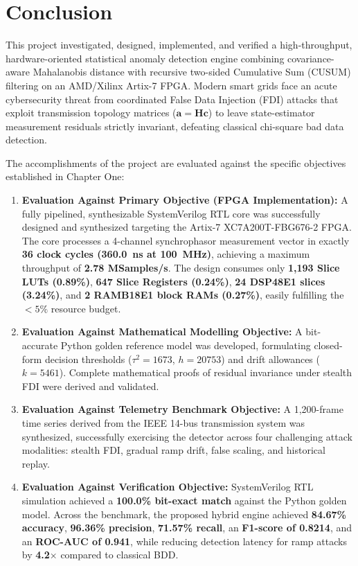 \documentclass[11pt,a4paper]{report}
\begin{document}
\section{Conclusion}
This project investigated, designed, implemented, and verified a high-throughput,
hardware-oriented statistical anomaly detection engine combining covariance-aware
Mahalanobis distance with recursive two-sided Cumulative Sum (CUSUM) filtering on
an AMD/Xilinx Artix-7 FPGA. Modern smart grids face an acute cybersecurity threat
from coordinated False Data Injection (FDI) attacks that exploit transmission topology
matrices ($\boldsymbol{a} = \boldsymbol{H}\boldsymbol{c}$) to leave state-estimator
measurement residuals strictly invariant, defeating classical chi-square bad data detection.

The accomplishments of the project are evaluated against the specific objectives
established in Chapter One:
\begin{enumerate}
    \item \textbf{Evaluation Against Primary Objective (FPGA Implementation):} A fully
    pipelined, synthesizable SystemVerilog RTL core was successfully designed and synthesized
    targeting the Artix-7 XC7A200T-FBG676-2 FPGA. The core processes a 4-channel synchrophasor
    measurement vector in exactly \textbf{36 clock cycles (360.0~ns at 100~MHz)}, achieving a
    maximum throughput of \textbf{2.78 MSamples/s}. The design consumes only \textbf{1,193 Slice LUTs (0.89\%)},
    \textbf{647 Slice Registers (0.24\%)}, \textbf{24 DSP48E1 slices (3.24\%)}, and
    \textbf{2 RAMB18E1 block RAMs (0.27\%)}, easily fulfilling the $< 5\%$ resource budget.
    \item \textbf{Evaluation Against Mathematical Modelling Objective:} A bit-accurate Python
    golden reference model was developed, formulating closed-form decision thresholds
    ($\tau^2 = 1673$, $h = 20753$) and drift allowances ($k = 5461$). Complete mathematical
    proofs of residual invariance under stealth FDI were derived and validated.
    \item \textbf{Evaluation Against Telemetry Benchmark Objective:} A 1,200-frame time series
    derived from the IEEE 14-bus transmission system was synthesized, successfully exercising
    the detector across four challenging attack modalities: stealth FDI, gradual ramp drift,
    false scaling, and historical replay.
    \item \textbf{Evaluation Against Verification Objective:} SystemVerilog RTL simulation
    achieved a \textbf{100.0\% bit-exact match} against the Python golden model. Across the
    benchmark, the proposed hybrid engine achieved \textbf{84.67\% accuracy}, \textbf{96.36\% precision},
    \textbf{71.57\% recall}, an \textbf{F1-score of 0.8214}, and an \textbf{ROC-AUC of 0.941},
    while reducing detection latency for ramp attacks by \textbf{4.2$\times$} compared to
    classical BDD.
\end{enumerate}
\end{document}
